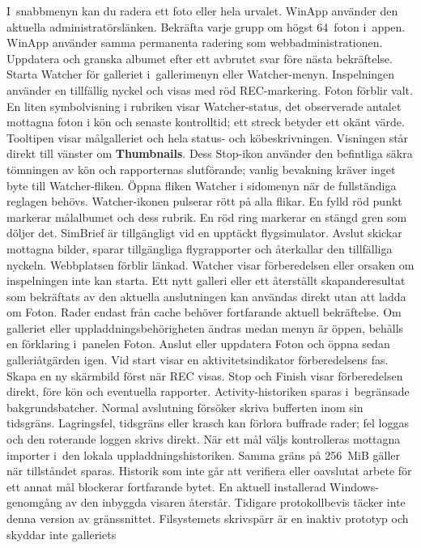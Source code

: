 \documentclass[11pt,a4paper]{article}
\newcommand{\ui}[1]{\textbf{#1}}
\begin{document}
I~snabbmenyn kan du radera ett foto eller hela urvalet. WinApp använder
den aktuella administratörslänken. Bekräfta varje grupp om högst 64~foton
i~appen. WinApp använder samma permanenta radering som webbadministrationen.
Uppdatera och granska albumet efter ett avbrutet svar före nästa bekräftelse.
Starta Watcher för galleriet i~gallerimenyn eller Watcher-menyn. Inspelningen
använder en tillfällig nyckel och visas med röd REC-markering. Foton förblir
valt. En liten symbolvisning i rubriken visar Watcher-status, det observerade
antalet mottagna foton i kön och senaste kontrolltid; ett streck betyder
ett okänt värde. Tooltipen visar målgalleriet och hela status- och
köbeskrivningen. Visningen står direkt till vänster om \ui{Thumbnails}.
Dess Stop-ikon använder den befintliga säkra tömningen av kön och rapporternas
slutförande; vanlig bevakning kräver inget byte till Watcher-fliken.
Öppna fliken Watcher i sidomenyn när de fullständiga reglagen
behövs. Watcher-ikonen
pulserar rött på alla flikar. En fylld röd punkt markerar målalbumet och dess
rubrik. En röd ring markerar en stängd gren som döljer det. SimBrief är
tillgängligt vid en upptäckt flygsimulator. Avslut skickar mottagna bilder,
sparar tillgängliga flygrapporter och återkallar den tillfälliga nyckeln.
Webbplatsen förblir länkad.
Watcher visar förberedelsen eller orsaken om inspelningen inte kan starta.
Ett nytt galleri eller ett återställt skapanderesultat som bekräftats av
den aktuella anslutningen kan användas direkt utan att ladda om Foton.
Rader endast från cache behöver fortfarande aktuell bekräftelse. Om
galleriet eller uppladdningsbehörigheten ändras medan menyn är öppen,
behålls en förklaring i~panelen Foton. Anslut eller uppdatera Foton och
öppna sedan galleriåtgärden igen.
Vid start visar en aktivitetsindikator förberedelsens fas. Skapa en ny
skärmbild först när REC visas. Stop och Finish visar förberedelsen direkt,
före kön och eventuella rapporter.
Activity-historiken sparas i~begränsade bakgrundsbatcher. Normal avslutning
försöker skriva bufferten inom sin tidsgräns. Lagringsfel, tidsgräns eller
krasch kan förlora buffrade rader; fel loggas och den roterande loggen skrivs
direkt.
När ett mål väljs kontrolleras mottagna importer i~den lokala
uppladdningshistoriken. Samma gräns på 256~MiB gäller när tillståndet sparas.
Historik som inte går att verifiera eller oavslutat arbete för ett annat mål
blockerar fortfarande bytet.
En aktuell installerad Windows-genomgång
av den inbyggda visaren återstår. Tidigare protokollbevis täcker inte denna
version av gränssnittet.
Filsystemets skrivspärr är en inaktiv prototyp och skyddar inte galleriets
\end{document}
